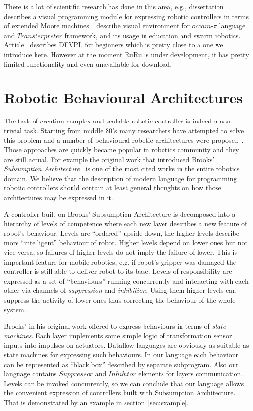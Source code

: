 \documentclass[conference,compsoc]{IEEEtran}
\begin{document}
There is a lot of scientific research has done in this area, e.g., dissertation~\cite{banyasad2000visual} describes a visual programming module for expressing robotic controllers in terms of extended Moore machines,~\cite{simpson2008visual, posso2011process} describe visual environment for $occam\mbox{-}\pi$ language and $Transterpreter$ framework, and its usage in education and swarm robotics. Article~\cite{diprose2011ruru} describes DFVPL for beginners which is pretty close to a one we introduce here. However at the moment RuRu is under development, it has pretty limited functionality and even unavailable for download.

\section{Robotic Behavioural Architectures}
\label{sec:Architectures}

The task of creation complex and scalable robotic controller is indeed a non-trivial task. Starting from middle 80's many researchers have attempted to solve this problem and a number of behavioural robotic architectures were proposed~\cite{simpson2009toward}. Those approaches are quickly became popular in robotics community and they are still actual. For example the original work that introduced Brooks' \textit{Subsumption Architecture}~\cite{brooks1986robust} is one of the most cited works in the entire robotics domain. We believe that the description of modern language for programming robotic controllers should contain at least general thoughts on how those architectures may be expressed in it.

A controller built on Brooks' Subsumption Architecture is decomposed into a hierarchy of levels of competence where each new layer describes a new feature of robot's behaviour. Levels are ``ordered'' upside-down, the higher levels describe more ``intelligent''  behaviour of robot. Higher levels depend on lower ones but not vice versa, so failures of higher levels do not imply the failure of lower. This is important feature for mobile robotics, e.g. if robot's gripper was damaged the controller is still able to deliver robot to its base. Levels of responsibility are expressed as a set of ``behaviours'' running concurrently and interacting with each other via channels of \textit{suppression} and \textit{inhibition}. Using them higher levels can suppress the activity of lower ones thus correcting the behaviour of the whole system.

Brooks' in his original work offered to express behaviours in terms of \textit{state machines}. Each layer implements some simple logic of transformation sensor inputs into impulses on actuators. Dataflow languages are obviously as suitable as state machines for expressing such behaviours. In our language each behaviour can be represented as ``black box'' described by separate subprogram. Also our language contains $Suppressor$ and $Inhibitor$ elements for layers communication. Levels can be invoked concurrently, so we can conclude that our language allows the convenient expression of controllers built with Subsumption Architecture. That is demonstrated by an example in section~\ref{sec:example}.
\end{document}
